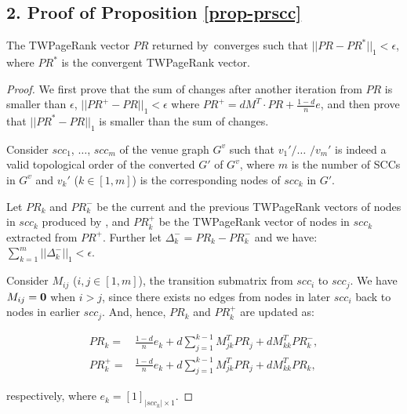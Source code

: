 \subsection*{2. Proof of Proposition \ref{prop-prscc}}
The TWPageRank vector $PR$ returned by~\twprscc converges such that $||PR-PR^*||_1 < \epsilon$, where $PR^*$ is the convergent TWPageRank vector.

\begin{proof}
We first prove that the sum of changes after another iteration from $PR$ is smaller than $\epsilon$, \ie $||PR^+-PR||_1 < \epsilon$ where $PR^+=d M^T\cdot PR + \frac{1-d}{n} e$, and then prove that $||PR^*-PR||_1$ is smaller than the sum of changes.

Consider $scc_1$, $\dots$, $scc_m$ of the venue graph $G^v$ such that $v_1'/\dots$ $/v_m'$ is indeed a valid topological order of the converted $G'$ of $G^v$, where $m$ is the number of SCCs in $G^v$ and $v_k'$ ($k\in [1,m]$) is the corresponding nodes of $scc_k$ in $G'$.

Let $PR_k$ and $PR_k^-$ be the current and the previous TWPageRank vectors of nodes in $scc_k$ produced
by \twprscc, and $PR_k^+$ be the TWPageRank vector of nodes in $scc_k$ extracted from $PR^+$.
Further let $\Delta_k^-=PR_k-PR_k^-$ and we have:
$\sum_{k=1}^m ||\Delta_k^-||_1 < \epsilon$.

Consider $M_{ij}$ ($i,j\in[1,m]$), the transition submatrix from $scc_i$ to $scc_j$. We have $M_{ij}=\bf{0}$ when $i>j$, since there exists no edges from nodes in later $scc_i$ back to nodes in earlier $scc_j$. And, hence, $PR_k$ and $PR_k^+$ are updated as:
\vspace{-1ex}

\begin{small}
\begin{equation*}
\begin{split}
PR_k=&\frac{1-d}{n} e_k+ d \sum_{j=1}^{k-1} M_{jk}^T PR_j + d M_{kk}^T PR_k^-,\\
PR_k^+=&\frac{1-d}{n}  e_k+ d \sum_{j=1}^{k-1} M_{jk}^T PR_j + d M_{kk}^T PR_k,
\end{split}
\end{equation*}
\end{small}

\vspace{-1ex}
\noindent
respectively, where $e_k=[1]_{|scc_k|\times 1}$.


\end{proof}
